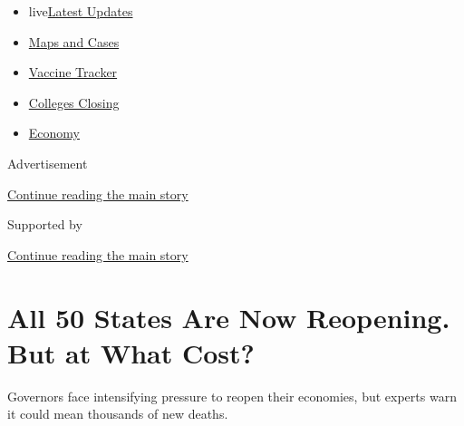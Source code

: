 \begin{itemize}
\tightlist
\item
  live\href{https://www.nytimes3xbfgragh.onion/2020/08/21/world/covid-19-coronavirus.html?name=styln-coronavirus-national\&region=TOP_BANNER\&variant=undefined\&block=storyline_menu_recirc\&action=click\&pgtype=Article\&impression_id=1b5d27a1-e39a-11ea-ad89-c1522ca3443c}{Latest
  Updates}
\item
  \href{https://www.nytimes3xbfgragh.onion/interactive/2020/us/coronavirus-us-cases.html?name=styln-coronavirus-national\&region=TOP_BANNER\&variant=undefined\&block=storyline_menu_recirc\&action=click\&pgtype=Article\&impression_id=1b5d27a2-e39a-11ea-ad89-c1522ca3443c}{Maps
  and Cases}
\item
  \href{https://www.nytimes3xbfgragh.onion/interactive/2020/science/coronavirus-vaccine-tracker.html?name=styln-coronavirus-national\&region=TOP_BANNER\&variant=undefined\&block=storyline_menu_recirc\&action=click\&pgtype=Article\&impression_id=1b5d27a3-e39a-11ea-ad89-c1522ca3443c}{Vaccine
  Tracker}
\item
  \href{https://www.nytimes3xbfgragh.onion/2020/08/19/us/colleges-closing-covid.html?name=styln-coronavirus-national\&region=TOP_BANNER\&variant=undefined\&block=storyline_menu_recirc\&action=click\&pgtype=Article\&impression_id=1b5d4eb0-e39a-11ea-ad89-c1522ca3443c}{Colleges
  Closing}
\item
  \href{https://www.nytimes3xbfgragh.onion/live/2020/08/20/business/stock-market-today-coronavirus?name=styln-coronavirus-national\&region=TOP_BANNER\&variant=undefined\&block=storyline_menu_recirc\&action=click\&pgtype=Article\&impression_id=1b5d4eb1-e39a-11ea-ad89-c1522ca3443c}{Economy}
\end{itemize}

Advertisement

\protect\hyperlink{after-top}{Continue reading the main story}

Supported by

\protect\hyperlink{after-sponsor}{Continue reading the main story}

\hypertarget{all-50-states-are-now-reopening-but-at-what-cost}{%
\section{All 50 States Are Now Reopening. But at What
Cost?}\label{all-50-states-are-now-reopening-but-at-what-cost}}

Governors face intensifying pressure to reopen their economies, but
experts warn it could mean thousands of new deaths.

